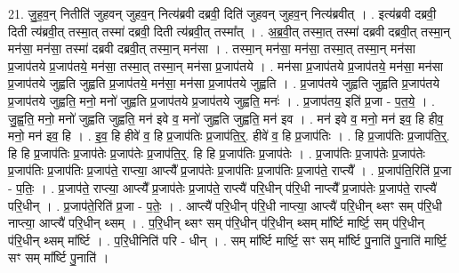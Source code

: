 \documentclass[17pt]{extarticle}
\begin{document}
21. जु॒ह॒व॒न् नितीति॑ जुहवन् जुहव॒न् नित्य॑ब्रवी दब्रवी॒ दिति॑ जुहवन् जुहव॒न् नित्य॑ब्रवीत् । . इत्य॑ब्रवी दब्रवी॒ दिती त्य॑ब्रवी॒त् तस्मा॒त् तस्मा॑ दब्रवी॒ दिती त्य॑ब्रवी॒त् तस्मा᳚त् । . अ॒ब्र॒वी॒त् तस्मा॒त् तस्मा॑ दब्रवी दब्रवी॒त् तस्मा॒न् मन॑सा॒ मन॑सा॒ तस्मा॑ दब्रवी दब्रवी॒त् तस्मा॒न् मन॑सा । . तस्मा॒न् मन॑सा॒ मन॑सा॒ तस्मा॒त् तस्मा॒न् मन॑सा प्र॒जाप॑तये प्र॒जाप॑तये॒ मन॑सा॒ तस्मा॒त् तस्मा॒न् मन॑सा प्र॒जाप॑तये । . मन॑सा प्र॒जाप॑तये प्र॒जाप॑तये॒ मन॑सा॒ मन॑सा प्र॒जाप॑तये जुह्वति जुह्वति प्र॒जाप॑तये॒ मन॑सा॒ मन॑सा प्र॒जाप॑तये जुह्वति । . प्र॒जाप॑तये जुह्वति जुह्वति प्र॒जाप॑तये प्र॒जाप॑तये जुह्वति॒ मनो॒ मनो॑ जुह्वति प्र॒जाप॑तये प्र॒जाप॑तये जुह्वति॒ मनः॑ । . प्र॒जाप॑तय॒ इति॑ प्र॒जा - प॒त॒ये॒ । . जु॒ह्व॒ति॒ मनो॒ मनो॑ जुह्वति जुह्वति॒ मन॑ इवे व॒ मनो॑ जुह्वति जुह्वति॒ मन॑ इव । . मन॑ इवे व॒ मनो॒ मन॑ इव॒ हि हीव॒ मनो॒ मन॑ इव॒ हि । . इ॒व॒ हि हीवे॑ व॒ हि प्र॒जाप॑तिः प्र॒जाप॑ति॒र्॒. हीवे॑ व॒ हि प्र॒जाप॑तिः । . हि प्र॒जाप॑तिः प्र॒जाप॑ति॒र्॒. हि हि प्र॒जाप॑तिः प्र॒जाप॑तेः प्र॒जाप॑तेः प्र॒जाप॑ति॒र्॒. हि हि प्र॒जाप॑तिः प्र॒जाप॑तेः । . प्र॒जाप॑तिः प्र॒जाप॑तेः प्र॒जाप॑तेः प्र॒जाप॑तिः प्र॒जाप॑तिः प्र॒जाप॑ते॒ राप्त्या॒ आप्त्यै᳚ प्र॒जाप॑तेः प्र॒जाप॑तिः प्र॒जाप॑तिः प्र॒जाप॑ते॒ राप्त्यै᳚ । . प्र॒जाप॑ति॒रिति॑ प्र॒जा - प॒तिः॒ । . प्र॒जाप॑ते॒ राप्त्या॒ आप्त्यै᳚ प्र॒जाप॑तेः प्र॒जाप॑ते॒ राप्त्यै॑ परि॒धीन् प॑रि॒धी नाप्त्यै᳚ प्र॒जाप॑तेः प्र॒जाप॑ते॒ राप्त्यै॑ परि॒धीन् । . प्र॒जाप॑ते॒रिति॑ प्र॒जा - प॒तेः॒ । . आप्त्यै॑ परि॒धीन् प॑रि॒धी नाप्त्या॒ आप्त्यै॑ परि॒धीन् थ्सꣳ सम् प॑रि॒धी नाप्त्या॒ आप्त्यै॑ परि॒धीन् थ्सम् । . प॒रि॒धीन् थ्सꣳ सम् प॑रि॒धीन् प॑रि॒धीन् थ्सम् मा᳚र्ष्टि मार्ष्टि॒ सम् प॑रि॒धीन् प॑रि॒धीन् थ्सम् मा᳚र्ष्टि । . प॒रि॒धीनिति॑ परि - धीन् । . सम् मा᳚र्ष्टि मार्ष्टि॒ सꣳ सम् मा᳚र्ष्टि पु॒नाति॑ पु॒नाति॑ मार्ष्टि॒ सꣳ सम् मा᳚र्ष्टि पु॒नाति॑ । \newline
\end{document}
